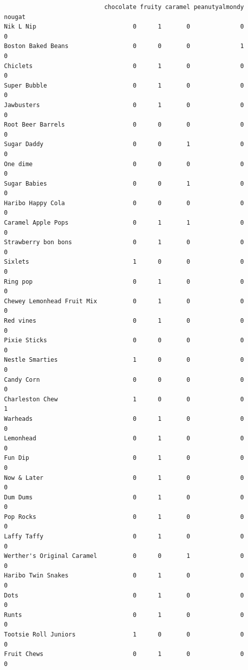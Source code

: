 \documentclass[
  letterpaper,
  DIV=11,
  numbers=noendperiod]{scrartcl}
\begin{document}
\begin{verbatim}
                            chocolate fruity caramel peanutyalmondy nougat
Nik L Nip                           0      1       0              0      0
Boston Baked Beans                  0      0       0              1      0
Chiclets                            0      1       0              0      0
Super Bubble                        0      1       0              0      0
Jawbusters                          0      1       0              0      0
Root Beer Barrels                   0      0       0              0      0
Sugar Daddy                         0      0       1              0      0
One dime                            0      0       0              0      0
Sugar Babies                        0      0       1              0      0
Haribo Happy Cola                   0      0       0              0      0
Caramel Apple Pops                  0      1       1              0      0
Strawberry bon bons                 0      1       0              0      0
Sixlets                             1      0       0              0      0
Ring pop                            0      1       0              0      0
Chewey Lemonhead Fruit Mix          0      1       0              0      0
Red vines                           0      1       0              0      0
Pixie Sticks                        0      0       0              0      0
Nestle Smarties                     1      0       0              0      0
Candy Corn                          0      0       0              0      0
Charleston Chew                     1      0       0              0      1
Warheads                            0      1       0              0      0
Lemonhead                           0      1       0              0      0
Fun Dip                             0      1       0              0      0
Now & Later                         0      1       0              0      0
Dum Dums                            0      1       0              0      0
Pop Rocks                           0      1       0              0      0
Laffy Taffy                         0      1       0              0      0
Werther's Original Caramel          0      0       1              0      0
Haribo Twin Snakes                  0      1       0              0      0
Dots                                0      1       0              0      0
Runts                               0      1       0              0      0
Tootsie Roll Juniors                1      0       0              0      0
Fruit Chews                         0      1       0              0      0

\end{verbatim}
\end{document}

